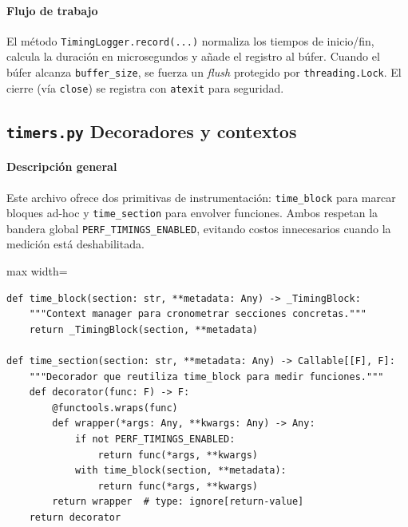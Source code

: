 \paragraph{Flujo de trabajo}
El método \texttt{TimingLogger.record(...)} normaliza los tiempos de inicio/fin, calcula la duración en microsegundos y añade el registro al búfer. Cuando el búfer alcanza \texttt{buffer\_size}, se fuerza un \emph{flush} protegido por \texttt{threading.Lock}. El cierre (vía \texttt{close}) se registra con \texttt{atexit} para seguridad.

\subsection{\texttt{timers.py} \- Decoradores y contextos}
\paragraph{Descripción general}
Este archivo ofrece dos primitivas de instrumentación: \texttt{time\_block} para marcar bloques ad-hoc y \texttt{time\_section} para envolver funciones. Ambos respetan la bandera global \texttt{PERF\_TIMINGS\_ENABLED}, evitando costos innecesarios cuando la medición está deshabilitada.

\begin{listing}[H]
\caption{\texttt{time\_block} y \texttt{time\_section}}
\begin{adjustbox}{max width=\textwidth}
\begin{minipage}{\textwidth}
\begin{verbatim}
def time_block(section: str, **metadata: Any) -> _TimingBlock:
    """Context manager para cronometrar secciones concretas."""
    return _TimingBlock(section, **metadata)

def time_section(section: str, **metadata: Any) -> Callable[[F], F]:
    """Decorador que reutiliza time_block para medir funciones."""
    def decorator(func: F) -> F:
        @functools.wraps(func)
        def wrapper(*args: Any, **kwargs: Any) -> Any:
            if not PERF_TIMINGS_ENABLED:
                return func(*args, **kwargs)
            with time_block(section, **metadata):
                return func(*args, **kwargs)
        return wrapper  # type: ignore[return-value]
    return decorator
\end{verbatim}
\end{minipage}
\end{adjustbox}
\end{listing}

